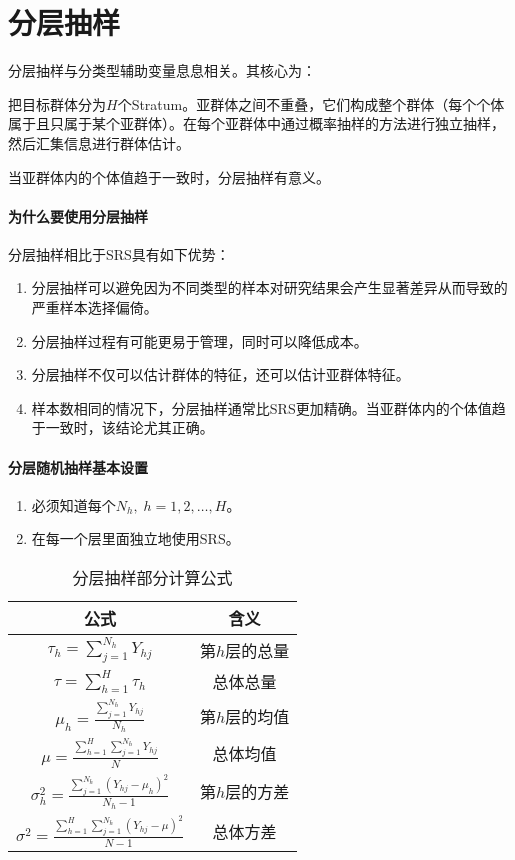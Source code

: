 \chapter{分层抽样}
分层抽样与分类型辅助变量息息相关。其核心为：\par
把目标群体分为$H$个\gls{Stratum}。亚群体之间不重叠，它们构成整个群体（每个个体属于且只属于某个亚群体）。在每个亚群体中通过概率抽样的方法进行独立抽样，然后汇集信息进行群体估计。

当亚群体内的个体值趋于一致时，分层抽样有意义。

\subsubsection{为什么要使用分层抽样}
分层抽样相比于SRS具有如下优势：
\begin{enumerate}
	\item 分层抽样可以避免因为不同类型的样本对研究结果会产生显著差异从而导致的严重样本选择偏倚。
	\item 分层抽样过程有可能更易于管理，同时可以降低成本。
	\item 分层抽样不仅可以估计群体的特征，还可以估计亚群体特征。
	\item 样本数相同的情况下，分层抽样通常比SRS更加精确。当亚群体内的个体值趋于一致时，该结论尤其正确。
\end{enumerate}

\subsubsection{分层随机抽样基本设置}
\begin{enumerate}
	\item 必须知道每个$N_h,\;h=1,2,\dots,H$。
	\item 在每一个层里面独立地使用SRS。
\end{enumerate}

\begin{table}[h]
	\centering
	\setlength{\tabcolsep}{25pt} %
	\renewcommand{\arraystretch}{1.5}
	\begin{tabular}{cc}
		\toprule
		公式      & 含义 \\
		\midrule
		$\tau_h=\sum_{j=1}^{N_h}Y_{hj}$ & 第$h$层的总量 \\
		$\tau=\sum_{h=1}^H\tau_{h}$	& 总体总量 \\
		$\mu_h=\frac{\sum_{j=1}^{N_h}Y_{hj}}{N_h}$                 
		& 第$h$层的均值 \\
		$\mu=\frac{\sum_{h=1}^H\sum_{j=1}^{N_h}Y_{hj}}{N}$           
		& 总体均值 \\
		$\sigma^2_h=\frac{\sum_{j=1}^{N_h}\left(Y_{hj}-\mu_h\right)^2}{N_h-1}$                       & 第$h$层的方差 \\
		$\sigma^2=\frac{\sum_{h=1}^H\sum_{j=1}^{N_h}\left(Y_{hj}-\mu\right)^2}{N-1}$                 & 总体方差 \\
		\bottomrule
	\end{tabular}
	\caption{分层抽样部分计算公式}
\end{table}

